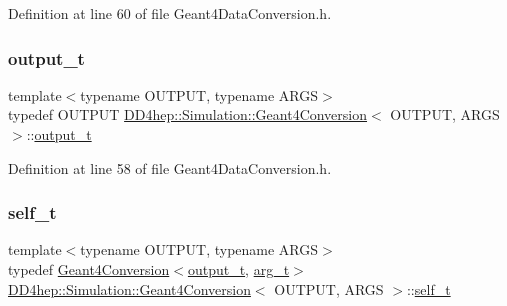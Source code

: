 Definition at line 60 of file Geant4\+Data\+Conversion.\+h.

\hypertarget{class_d_d4hep_1_1_simulation_1_1_geant4_conversion_a9a6bd3ad991e9d1f61751201d4307d4a}{}\label{class_d_d4hep_1_1_simulation_1_1_geant4_conversion_a9a6bd3ad991e9d1f61751201d4307d4a} 
\subsubsection{\texorpdfstring{output\+\_\+t}{output\_t}}
{\footnotesize\ttfamily template$<$typename O\+U\+T\+P\+UT, typename A\+R\+GS$>$ \\
typedef O\+U\+T\+P\+UT \hyperlink{class_d_d4hep_1_1_simulation_1_1_geant4_conversion}{D\+D4hep\+::\+Simulation\+::\+Geant4\+Conversion}$<$ O\+U\+T\+P\+UT, A\+R\+GS $>$\+::\hyperlink{class_d_d4hep_1_1_simulation_1_1_geant4_conversion_a9a6bd3ad991e9d1f61751201d4307d4a}{output\+\_\+t}}



Definition at line 58 of file Geant4\+Data\+Conversion.\+h.

\hypertarget{class_d_d4hep_1_1_simulation_1_1_geant4_conversion_ac48f71e223506f7c92f8358299ac5dfe}{}\label{class_d_d4hep_1_1_simulation_1_1_geant4_conversion_ac48f71e223506f7c92f8358299ac5dfe} 
\subsubsection{\texorpdfstring{self\+\_\+t}{self\_t}}
{\footnotesize\ttfamily template$<$typename O\+U\+T\+P\+UT, typename A\+R\+GS$>$ \\
typedef \hyperlink{class_d_d4hep_1_1_simulation_1_1_geant4_conversion}{Geant4\+Conversion}$<$\hyperlink{class_d_d4hep_1_1_simulation_1_1_geant4_conversion_a9a6bd3ad991e9d1f61751201d4307d4a}{output\+\_\+t}, \hyperlink{class_d_d4hep_1_1_simulation_1_1_geant4_conversion_a2a9680db46d2a136982d290c9b11e6f8}{arg\+\_\+t}$>$ \hyperlink{class_d_d4hep_1_1_simulation_1_1_geant4_conversion}{D\+D4hep\+::\+Simulation\+::\+Geant4\+Conversion}$<$ O\+U\+T\+P\+UT, A\+R\+GS $>$\+::\hyperlink{class_d_d4hep_1_1_simulation_1_1_geant4_conversion_ac48f71e223506f7c92f8358299ac5dfe}{self\+\_\+t}}



